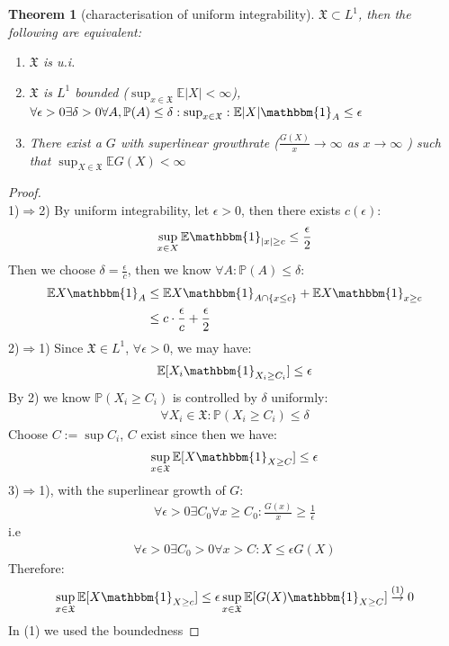 \documentclass[a4paper,11pt]{book}
\newtheorem{theorem}{Theorem}[section]
\theoremstyle{definition}
\theoremstyle{remark}
\begin{document}
\begin{theorem}[characterisation of uniform integrability]
	$\mathfrak{X} \subset L^1$, then the following are equivalent:
	\begin{enumerate}
		\item $\mathfrak{X}$ is u.i.
		\item $\mathfrak{X}$ is $L^1$ bounded ($\sup_{x \in \mathfrak{X}}\mathbb{E}|X| < \infty$), $\forall \epsilon > 0 \exists \delta > 0\forall A, \mathbb{P}(A) \leq \delta:\sup_{x \in \mathfrak{X}}: \mathbb{E}|X|\mathbbm{1}_A \leq \epsilon$

		\item There exist a $G$ with superlinear growthrate ($\frac{G(X)}{x} \rightarrow \infty$ as $x \rightarrow \infty$ ) such that $\sup_{X \in \mathfrak{X}} \mathbb{E}G(X) < \infty$
	\end{enumerate}
\end{theorem}
\begin{proof}\quad\\
1)$\Rightarrow$2)
	By uniform integrability, let $\epsilon > 0$, then there exists $c(\epsilon)$:
	\begin{align*}
		\sup_{x \in X} \mathbb{E}\mathbbm{1}_{|x| \geq c} \le \frac{\epsilon}{2}
	\end{align*}
	Then we choose $\delta = \frac{\epsilon}{c}$, then we know $\forall A : \mathbb{P}( A) \leq \delta$: 
	\begin{align*}
		\mathbb{E}X\mathbbm{1}_A &\leq \mathbb{E} X \mathbbm{1}_{A \cap \{x \leq c\}} + \mathbb{E}X\mathbbm{1}_{x \geq c}\\
		&\leq c \cdot \frac{\epsilon}{c} +  \frac{\epsilon}{2}
	\end{align*}
	2)$\Rightarrow$1)\label{Q:UI} Since $\mathfrak{X} \in L^1$, $\forall \epsilon >0$, we may have:
	\begin{align*}
		\mathbb{E}[X_i \mathbbm{1}_{X_i \geq C_i}] \leq \epsilon
	\end{align*}
	By 2) we know $\mathbb{P}(X_i \geq C_i)$ is controlled by $\delta$ uniformly:
	\begin{align*}
		\forall X_i \in \mathfrak{X}: \mathbb{P}(X_i \geq C_i) \leq \delta
	\end{align*}
	Choose $C:= \sup C_i$, $C$ exist since then we have:
	\begin{align*}
		\sup_{x \in \mathfrak{X}} \mathbb{E}[X\mathbbm{1}_{X \geq C}] \leq
		 \epsilon
	\end{align*}
	3)$\Rightarrow$1), with the superlinear growth of $G$:
	\begin{align*}
		\forall \epsilon > 0 \exists C_0 \forall x \geq C_0:\frac{G(x)}{x} \geq \frac{1}{\epsilon} 
	\end{align*}
	i.e
	\begin{align*}
		\forall \epsilon > 0 \exists C_0> 0 \forall x > C: X \leq \epsilon G(X)
	\end{align*}
	Therefore:
	\begin{align*}
		\sup_{x \in \mathfrak{X}} \mathbb{E}[X\mathbbm{1}_{X \geq c}] \leq \epsilon \sup_{x \in \mathfrak{X}} \mathbb{E}[G(X)\mathbbm{1}_{X \geq C}] \overset{(1)}{\rightarrow}0
	\end{align*}
	In (1) we used the boundedness
\end{proof}
\end{document}
